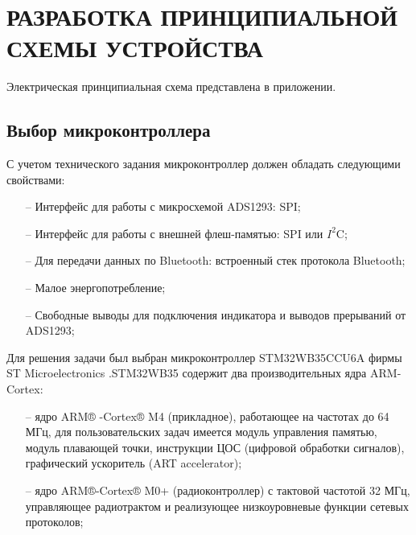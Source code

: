 \begin{sloppypar} %
\newpage %
\section{РАЗРАБОТКА ПРИНЦИПИАЛЬНОЙ СХЕМЫ УСТРОЙСТВА} %
Электрическая принципиальная схема представлена в приложении.




%  


\subsection{Выбор микроконтроллера}
С учетом технического задания микроконтроллер должен обладать следующими свойствами:
\begin{onehalfspace}
	\begin{itemize}
		\item[--]Интерфейс для работы с микросхемой ADS1293: SPI;
		\item[--]Интерфейс для работы с внешней флеш-памятью: SPI или $I^2$C;
		\item[--]Для передачи данных по Bluetooth: встроенный стек протокола Bluetooth;
		\item[--]Малое энергопотребление;
		\item[--]Свободные выводы для подключения индикатора и выводов прерываний от ADS1293;
	\end{itemize}
\end{onehalfspace}

Для решения задачи был выбран микроконтроллер STM32WB35CCU6A фирмы ST Microelectronics \cite {STM}.STM32WB35 содержит два производительных ядра ARM-Cortex:
\begin{onehalfspace}
	\begin{itemize}
		\item[--] ядро ARM® -Cortex® M4 (прикладное), работающее на частотах до 64 МГц, для пользовательских задач имеется модуль управления памятью, модуль плавающей точки, инструкции ЦОС (цифровой обработки сигналов), графический ускоритель (ART accelerator);
		\item[--] ядро ARM®-Cortex® M0+ (радиоконтроллер) с тактовой частотой 32 МГц, управляющее радиотрактом и реализующее низкоуровневые функции сетевых протоколов;
	\end{itemize}
\end{onehalfspace}


\end{sloppypar}
